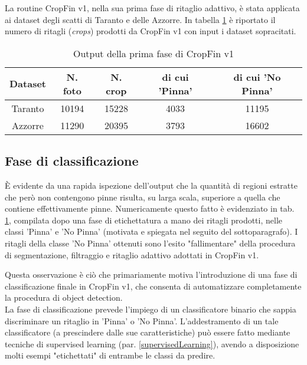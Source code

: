 La routine CropFin v1, nella sua prima fase di ritaglio adattivo, è stata applicata ai dataset degli scatti di Taranto e delle Azzorre. In tabella \ref{risultatiCrop} è riportato il numero di ritagli (\textit{crops}) prodotti da CropFin v1 con input i dataset sopracitati.

\begin{table}[h]

  \centering
  \begin{tabular}{c c c c c}
  \hline
  Dataset&N. foto&N. crop&di cui 'Pinna'&di cui 'No Pinna'\\
  \hline
  Taranto&10194&15228&4033&11195\\
  Azzorre&11290&20395&3793&16602\\
  \hline
  \end{tabular}
  
  \caption{Output della prima fase di CropFin v1}
  \label{risultatiCrop}

\end{table}

\subsection{Fase di classificazione}
\label{faseClassificazione}

È evidente da una rapida ispezione dell'output che la quantità di regioni estratte che però non contengono pinne risulta, su larga scala, superiore a quella che contiene effettivamente pinne. Numericamente questo fatto è evidenziato in tab. \ref{risultatiCrop}, compilata dopo una fase di etichettatura a mano dei ritagli prodotti, nelle classi 'Pinna' e 'No Pinna' (motivata e spiegata nel seguito del sottoparagrafo). I ritagli della classe 'No Pinna' ottenuti sono l’esito "fallimentare" della procedura di segmentazione, filtraggio e ritaglio adattivo adottati in CropFin v1.

Questa osservazione è ciò che primariamente motiva l’introduzione di una fase di classificazione finale in CropFin v1, che consenta di automatizzare completamente la procedura di object detection.\\

La fase di classificazione prevede l'impiego di un classificatore binario che sappia discriminare un ritaglio in 'Pinna' o 'No Pinna'. L'addestramento di un tale classificatore (a prescindere dalle sue caratteristiche) può essere fatto mediante tecniche di supervised learning (par. \ref{supervisedLearning}), avendo a disposizione molti esempi "etichettati" di entrambe le classi da predire.

